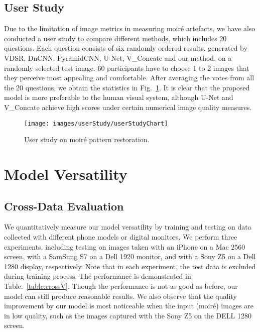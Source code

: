 \documentclass[journal]{IEEEtran}
\begin{document}
\subsection{User Study}
Due to the limitation of image metrics in measuring moir\'{e} artefacts, we have also conducted a user study to compare different methods, which includes 20 questions. Each question consists of six randomly ordered results, generated by VDSR, DnCNN, PyramidCNN, U-Net, V\_Concate and our method,  on a randomly selected test image. 60 participants have to choose 1 to 2 images that they perceive most appealing and comfortable. After averaging the votes from all the 20 questions, we obtain the statistics in Fig.~\ref{fig:userStudychart}. It is clear that the proposed model is more preferable to the human visual system, although U-Net and V\_Concate achieve high scores under certain numerical image quality measures.


\begin{figure}[htb!]
\begin{center}
 \texttt{[image: images/userStudy/userStudyChart]}
\end{center}
 \caption{User study on moir\'{e} pattern restoration.}
\label{fig:userStudychart}
\end{figure}

\section{Model Versatility}

\subsection{Cross-Data Evaluation}
We quantitatively measure our model versatility by training and testing on data collected with different phone models or digital monitors. We perform three experiments, including testing on images taken with an iPhone on a Mac 2560 screen, with a SamSung S7 on a Dell 1920 monitor, and with a Sony Z5 on a Dell 1280 display, respectively. Note that in each experiment, the test data is excluded during training process. The performance is demonstrated in Table.~\ref{table:crossV}. Though the performance is not as good as before, our model can still produce reasonable results. We also observe that the quality improvement by our model is most noticeable when the input (moir\'{e}) images are in low quality, such as the images captured with the Sony Z5 on the DELL 1280 screen.
\end{document}

